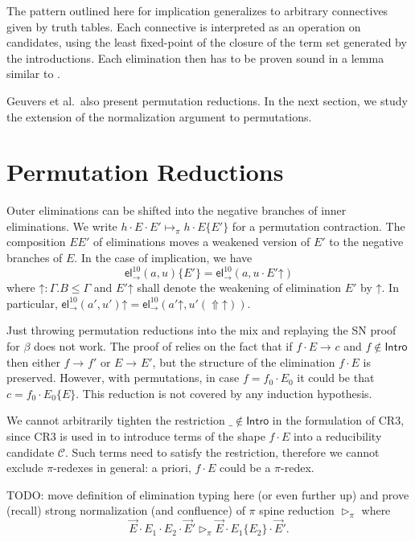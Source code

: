 \documentclass[a4paper,USenglish,cleveref, autoref, thm-restate]{lipics-v2019}
\newcommand{\tel}{\mathsf{el}}
\newcommand{\el}[2]{\tel_{#1}^{#2}}
\newcommand{\contract}[1][]{\mapsto_{#1}}
\newcommand{\whd}[1][]{\rhd_{#1}}
\newcommand{\red}[1][]{\longrightarrow_{#1}}
\newcommand{\C}{\mathcal{C}}
\newcommand{\Intro}{\mathsf{Intro}}
\newcommand{\Up}{\mathop{\Uparrow}}
\newcommand{\up}{\mathord{\uparrow}}
\begin{document}
The pattern outlined here for implication generalizes to arbitrary
connectives given by truth tables.  Each connective is interpreted as
an operation on candidates, using the least fixed-point of the closure
of the term set generated by the introductions.  Each elimination then
has to be proven sound in a lemma similar to .

Geuvers et al.\ also present permutation reductions.  In the next
section, we study the extension of the normalization argument to
permutations.

\section{Permutation Reductions}
\label{sec:perm}

Outer eliminations can be shifted into the negative branches of inner
eliminations.  We write
$h \cdot E \cdot E' \contract[\pi] h \cdot E\{E'\}$ for a permutation
contraction.  The composition $E{E'}$ of eliminations moves a weakened
version of $E'$ to the negative branches of $E$.  In the case of
implication, we have
\[
  \el\to{10}(a,u) \{ E' \} = \el\to{10}(a,u \cdot E' \up)
\]
where $\up : \Gamma.B \leq \Gamma$ and
$E' \up$ shall denote the weakening of elimination $E'$ by $\up$.
In particular, $\el\to{10}(a',u') \up = \el\to{10}(a' \up, u' (\Up\up))$.

Just throwing permutation reductions into the mix and replaying the SN
proof for $\beta$ does not work.  The proof of  relies
on the fact that if $f \cdot E \red c$ and $f \not\in \Intro$ then
either $f \red f'$ or $E \red E'$, but the structure of the
elimination $f \cdot E$ is preserved.  However, with permutations, in
case $f = f_0 \cdot E_0$ it could be that $c = f_0 \cdot E_0\{E\}$.
This reduction is not covered by any induction hypothesis.

We cannot arbitrarily tighten the restriction $\_ \not\in \Intro$ in
the formulation of CR3, since CR3 is used in  to
introduce terms of the shape $f \cdot E$
into a reducibility candidate $\C$.  Such terms need to satisfy the
restriction, therefore we cannot exclude $\pi$-redexes in general: a
priori, $f \cdot E$ could be a $\pi$-redex.

TODO: move definition of elimination typing here (or even further up) and
prove (recall) strong normalization (and confluence) of $\pi$ spine
reduction $\whd[\pi]$ where
\[
  \vec E \cdot E_1 \cdot E_2 \cdot \vec E'
  \whd[\pi]
 \vec E \cdot E_1\{E_2\} \cdot \vec E'
 .
\]
\end{document}
